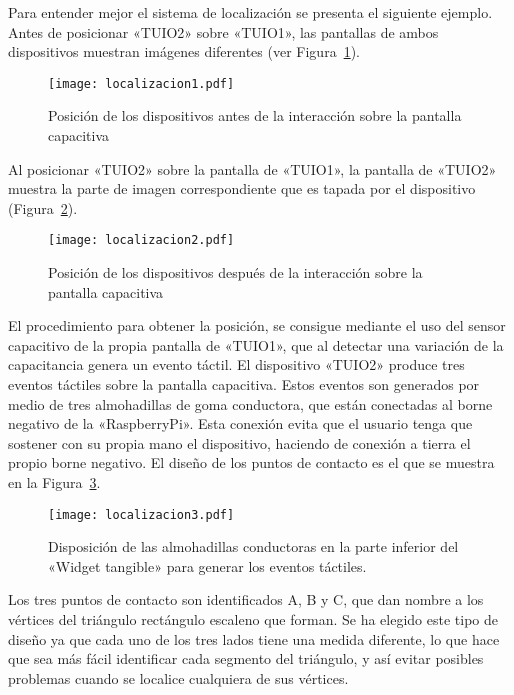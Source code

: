 Para entender mejor el sistema de localización se presenta el siguiente ejemplo. Antes de posicionar «TUIO2» sobre «TUIO1», las pantallas de ambos dispositivos muestran imágenes diferentes (ver Figura~\ref{fig:Localizacion1}).
\begin{figure}[!h]
\begin{center}
\texttt{[image: localizacion1.pdf]}
\caption{Posición de los dispositivos antes de la interacción sobre la pantalla capacitiva}
\label{fig:Localizacion1}
\end{center}
\end{figure}
Al posicionar «TUIO2» sobre la pantalla de «TUIO1», la pantalla de «TUIO2» muestra la parte de imagen correspondiente que es tapada por el dispositivo (Figura~\ref{fig:Localizacion2}).
\begin{figure}[!h]
\begin{center}
\texttt{[image: localizacion2.pdf]}
\caption{Posición de los dispositivos después de la interacción sobre la pantalla capacitiva}
\label{fig:Localizacion2}
\end{center}
\end{figure}

El procedimiento para obtener la posición, se consigue mediante el uso del sensor capacitivo de la propia pantalla de «TUIO1», que al detectar una variación de la capacitancia genera un evento táctil.
El dispositivo «TUIO2» produce tres eventos táctiles sobre la pantalla capacitiva. Estos eventos son generados por medio de tres almohadillas de goma conductora, que están conectadas al borne negativo de la «RaspberryPi». Esta conexión evita que el usuario tenga que sostener con su propia mano el dispositivo, haciendo de conexión a tierra el propio borne negativo.
El diseño de los puntos de contacto es el que se muestra en la Figura~\ref{fig:Localizacion3}.
\begin{figure}[!h]
\begin{center}
\texttt{[image: localizacion3.pdf]}
\caption{Disposición de las almohadillas conductoras en la parte inferior del «Widget tangible» para generar los eventos táctiles. }
\label{fig:Localizacion3}
\end{center}
\end{figure}
Los tres puntos de contacto son identificados A, B y C, que dan nombre a los vértices del triángulo rectángulo escaleno que forman. Se ha elegido este tipo de diseño ya que cada uno de los tres lados tiene una medida diferente, lo que hace que sea más fácil identificar cada segmento del triángulo, y así evitar posibles problemas cuando se localice cualquiera de sus vértices.

